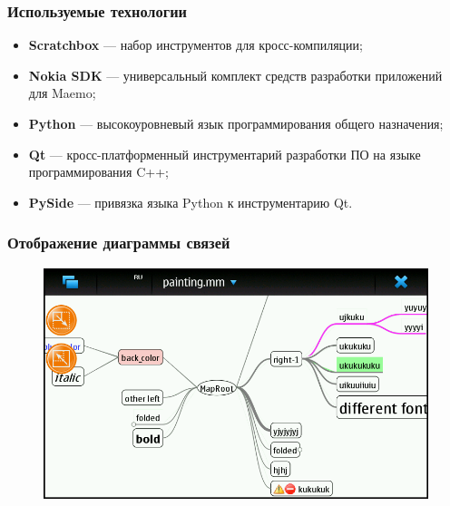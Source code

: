 \documentclass[unicode]{beamer}
\begin{document}
\begin{frame}
\transwipe[direction=90]
\frametitle{Используемые технологии}
\begin{itemize}
\item
{\textbf{Scratchbox}} --- набор инструментов для кросс-компиляции;
\item
{\textbf{Nokia SDK}} --- универсальный комплект средств разработки приложений для Maemo;
\item
{\textbf{Python}} --- высокоуровневый язык программирования общего назначения;
\item
{\textbf{Qt}} --- кросс-платформенный инструментарий разработки ПО на языке программирования C++;
\item
{\textbf{PySide}} --- привязка языка Python к инструментарию Qt.
\end{itemize}
\end{frame}

\begin{frame}
\transwipe[direction=90]
\frametitle{Отображение диаграммы связей}
\begin{figure}[h!] 
\centering 
\includegraphics[width=1\linewidth]{main_view} 
\end{figure}
\end{frame}
\end{document}
